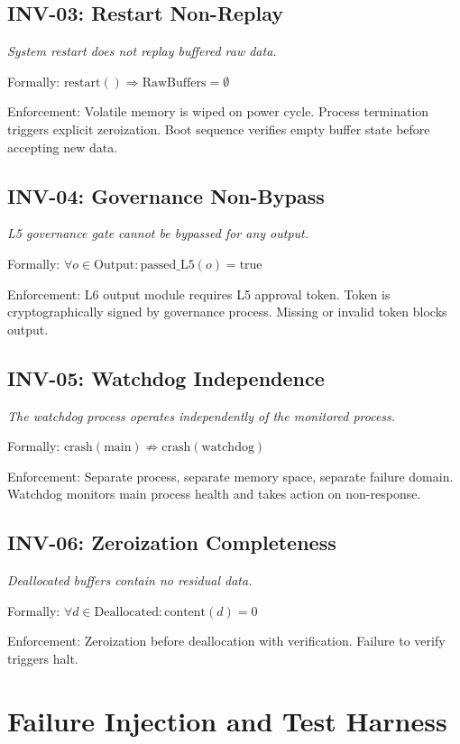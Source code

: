 \documentclass[conference]{IEEEtran}
\begin{document}
\subsection{INV-03: Restart Non-Replay}
\textit{System restart does not replay buffered raw data.}

Formally: $\text{restart}() \Rightarrow \text{RawBuffers} = \emptyset$

Enforcement: Volatile memory is wiped on power cycle. Process termination triggers explicit zeroization. Boot sequence verifies empty buffer state before accepting new data.

\subsection{INV-04: Governance Non-Bypass}
\textit{L5 governance gate cannot be bypassed for any output.}

Formally: $\forall o \in \text{Output}: \text{passed\_L5}(o) = \text{true}$

Enforcement: L6 output module requires L5 approval token. Token is cryptographically signed by governance process. Missing or invalid token blocks output.

\subsection{INV-05: Watchdog Independence}
\textit{The watchdog process operates independently of the monitored process.}

Formally: $\text{crash}(\text{main}) \not\Rightarrow \text{crash}(\text{watchdog})$

Enforcement: Separate process, separate memory space, separate failure domain. Watchdog monitors main process health and takes action on non-response.

\subsection{INV-06: Zeroization Completeness}
\textit{Deallocated buffers contain no residual data.}

Formally: $\forall d \in \text{Deallocated}: \text{content}(d) = 0$

Enforcement: Zeroization before deallocation with verification. Failure to verify triggers halt.

\section{Failure Injection and Test Harness}
\end{document}
